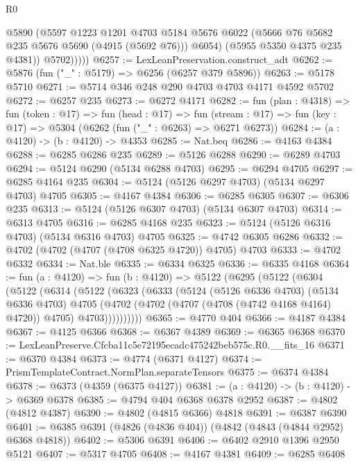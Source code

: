 \begin{lexlean}{R0}
\begin{coremodule}
                @5890
                (@5597
                  @1223
                  @1201
                  @4703
                  @5184
                  @5676
                  @6022
                  (@5666 @76 @5682 @235 @5676 @5690 (@4915 (@5692 @76)))
                  @6054)
                (@5955 @5350 @4375 @235 @4381))
              @5702)))))
@6257 := LexLeanPreservation.construct_adt
@6262 := @5876 (fun ("_" : @5179) => @6256 (@6257 @379 @5896))
@6263 := @5178 @5710
@6271 := @5714 @346 @248 @290 @4703 @4703 @4171 @4592 @5702
@6272 := @6257 @235
@6273 := @6272 @4171
@6282 := fun (plan : @4318) =>
  fun (token : @17) =>
  fun (head : @17) =>
  fun (stream : @17) => fun (key : @17) => @5304 (@6262 (fun ("_" : @6263) => @6271 @6273))
@6284 := (a : @4120) -> (b : @4120) -> @4353
@6285 := Nat.beq
@6286 := @4163 @4384
@6288 := @6285 @6286 @235
@6289 := @5126 @6288
@6290 := @6289 @4703
@6294 := @5124 @6290 (@5134 @6288 @4703)
@6295 := @6294 @4705
@6297 := @6285 @4164 @235
@6304 := @5124 (@5126 @6297 @4703) (@5134 @6297 @4703) @4705
@6305 := @4167 @4384
@6306 := @6285 @6305
@6307 := @6306 @235
@6313 := @5124 (@5126 @6307 @4703) (@5134 @6307 @4703)
@6314 := @6313 @4705
@6316 := @6285 @4168 @235
@6323 := @5124 (@5126 @6316 @4703) (@5134 @6316 @4703) @4705
@6325 := @4742 @6305 @6286
@6332 := @4702 (@4702 (@4707 (@4708 @6325 @4720)) @4705) @4703
@6333 := @4702 @6332
@6334 := Nat.ble
@6335 := @6334 @6325
@6336 := @6335 @4168
@6364 := fun (a : @4120) =>
  fun (b : @4120) =>
  @5122
    (@6295
      (@5122
        (@6304
          (@5122
            (@6314
              (@5122
                (@6323
                  (@6333
                    (@5124
                      (@5126 @6336 @4703)
                      (@5134 @6336 @4703)
                      @4705
                      (@4702 (@4702 (@4707 (@4708 (@4742 @4168 @4164) @4720)) @4705) @4703))))))))))
@6365 := @4770 @404
@6366 := @4187 @4384
@6367 := @4125 @6366
@6368 := @6367 @4389
@6369 := @6365 @6368
@6370 := LexLeanPreserve.Cfcba11c5e72195ecadc475242beb575c.R0.__fits_16
@6371 := @6370 @4384
@6373 := @4774 (@6371 @4127)
@6374 := PrismTemplateContract.NormPlan.separateTensors
@6375 := @6374 @4384
@6378 := @6373 (@4359 (@6375 @4127))
@6381 := (a : @4120) -> (b : @4120) -> @6369 @6378
@6385 := @4794 @404 @6368 @6378 @2952
@6387 := @4802 (@4812 @4387)
@6390 := @4802 (@4815 @6366) @4818
@6391 := @6387 @6390
@6401 := @6385 @6391 (@4826 (@4836 @404)) (@4842 (@4843 (@4844 @2952) @6368 @4818))
@6402 := @5306 @6391
@6406 := @6402 @2910 @1396 @2950 @5121
@6407 := @5317 @4705
@6408 := @4167 @4381
@6409 := @6285 @6408

\end{coremodule}
\end{lexlean}
